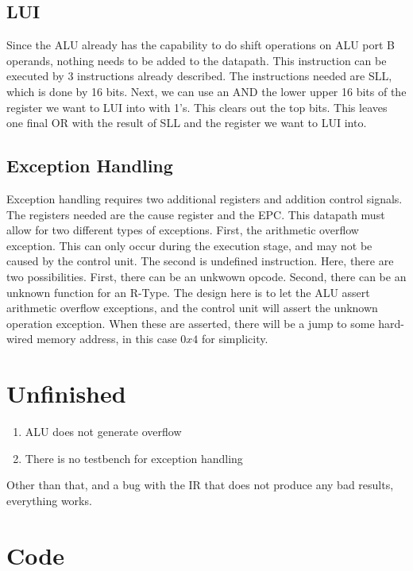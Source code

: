 \documentclass[12pt, a4paper]{article}
\begin{document}
\subsection{LUI}
Since the ALU already has the capability to do shift operations on ALU port B operands, nothing needs to be added to the datapath.
This instruction can be executed by 3 instructions already described. The instructions needed are SLL, which is done by 16 bits. Next,
we can use an AND the lower upper 16 bits of the register we want to LUI into with 1's. This clears out the top bits. This leaves one
final OR with the result of SLL and the register we want to LUI into.

\subsection{Exception Handling}
Exception handling requires two additional registers and addition control signals. The registers needed are the cause register and the EPC.
This datapath must allow for two different types of exceptions. First, the arithmetic overflow exception. This can only occur during the
execution stage, and may not be caused by the control unit. The second is undefined instruction. Here, there are two possibilities. First,
there can be an unkwown opcode. Second, there can be an unknown function for an R-Type. The design here is to let the ALU assert arithmetic
overflow exceptions, and the control unit will assert the unknown operation exception. When these are asserted, there will be a jump to
some hard-wired memory address, in this case $0x4$ for simplicity.


\section{Unfinished}
\begin{enumerate}
  \item ALU does not generate overflow
  \item There is no testbench for exception handling
\end{enumerate}
Other than that, and a bug with the IR that does not produce any bad results, everything works.

\appendix
\section{Code}
\end{document}
